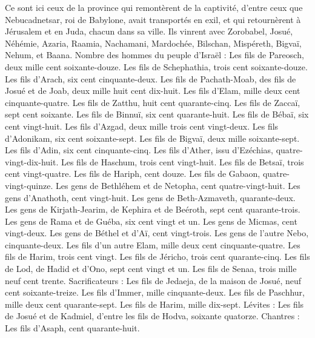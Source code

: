 \begin{multicols}{2}
Ce sont ici ceux de la province qui remontèrent de la captivité, d'entre ceux que Nebucadnetsar, roi de Babylone, avait transportés en exil, et qui retournèrent à Jérusalem et en Juda, chacun dans sa ville.
Ils vinrent avec Zorobabel, Josué, Néhémie, Azaria, Raamia, Nachamani, Mardochée, Bilschan, Mispéreth, Bigvaï, Nehum, et Baana. Nombre des hommes du peuple d'Israël :
Les fils de Pareosch, deux mille cent soixante-douze.
Les fils de Schephathia, trois cent soixante-douze.
Les fils d'Arach, six cent cinquante-deux.
Les fils de Pachath-Moab, des fils de Josué et de Joab, deux mille huit cent dix-huit.
Les fils d’Elam, mille deux cent cinquante-quatre.
Les fils de Zatthu, huit cent quarante-cinq.
Les fils de Zaccaï, sept cent soixante.
Les fils de Binnuï, six cent quarante-huit.
Les fils de Bébaï, six cent vingt-huit.
Les fils d’Azgad, deux mille trois cent vingt-deux.
Les fils d'Adonikam, six cent soixante-sept.
Les fils de Bigvaï, deux mille soixante-sept.
Les fils d’Adin, six cent cinquante-cinq.
Les fils d'Ather, issu d'Ezéchias, quatre-vingt-dix-huit.
Les fils de Haschum, trois cent vingt-huit.
Les fils de Betsaï, trois cent vingt-quatre.
Les fils de Hariph, cent douze.
Les fils de Gabaon, quatre-vingt-quinze.
Les gens de Bethléhem et de Netopha, cent quatre-vingt-huit.
Les gens d'Anathoth, cent vingt-huit.
Les gens de Beth-Azmaveth, quarante-deux.
Les gens de Kirjath-Jearim, de Kephira et de Beéroth, sept cent quarante-trois.
Les gens de Rama et de Guéba, six cent vingt et un.
Les gens de Micmas, cent vingt-deux.
Les gens de Béthel et d’Aï, cent vingt-trois.
Les gens de l'autre Nebo, cinquante-deux.
Les fils d'un autre Elam, mille deux cent cinquante-quatre.
Les fils de Harim, trois cent vingt.
Les fils de Jéricho, trois cent quarante-cinq.
Les fils de Lod, de Hadid et d'Ono, sept cent vingt et un.
Les fils de Senaa, trois mille neuf cent trente.
Sacrificateurs : Les fils de Jedaeja, de la maison de Josué, neuf cent soixante-treize.
Les fils d'Immer, mille cinquante-deux.
Les fils de Paschhur, mille deux cent quarante-sept.
Les fils de Harim, mille dix-sept.
Lévites : Les fils de Josué et de Kadmiel, d'entre les fils de Hodva, soixante quatorze.
Chantres : Les fils d'Asaph, cent quarante-huit.

\end{multicols}
